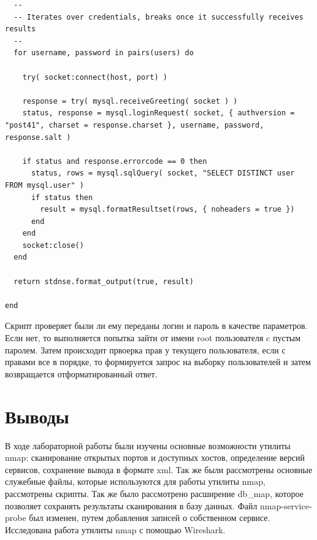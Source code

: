 \documentclass[10pt,a4paper,titlepage]{article}
\begin{document}
\begin{verbatim}
  --
  -- Iterates over credentials, breaks once it successfully receives results
  --
  for username, password in pairs(users) do

    try( socket:connect(host, port) )

    response = try( mysql.receiveGreeting( socket ) )
    status, response = mysql.loginRequest( socket, { authversion = "post41", charset = response.charset }, username, password, response.salt )

    if status and response.errorcode == 0 then
      status, rows = mysql.sqlQuery( socket, "SELECT DISTINCT user FROM mysql.user" )
      if status then
        result = mysql.formatResultset(rows, { noheaders = true })
      end
    end
    socket:close()
  end

  return stdnse.format_output(true, result)

end
\end{verbatim}

Скрипт проверяет были ли ему переданы логин и пароль в качестве параметров. Если нет, то выполняется попытка зайти от имени root пользователя c пустым паролем. Затем происходит првоерка прав у текущего пользователя, если с правами все в порядке, то формируется запрос на выборку пользователей и затем возвращается отформатированный ответ.

\section{Выводы}
В ходе лабораторной работы были изучены основные возможности утилиты nmap: сканирование открытых портов и доступных хостов, определение версий сервисов, сохранение вывода в формате xml. Так же были рассмотрены основные служебные файлы, которые используются для работы утилиты nmap, рассмотрены скрипты. Так же было рассмотрено расширение db\_map, которое позволяет сохранять результаты сканирования в базу данных. Файл nmap-service-probe был изменен, путем добавления записей о собственном сервисе. Исследована работа утилиты nmap с помощью Wireshark.
\end{document}
